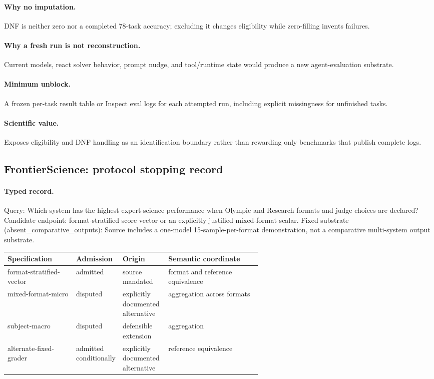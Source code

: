 \paragraph{Why no imputation.} DNF is neither zero nor a completed 78-task accuracy; excluding it changes eligibility while zero-filling invents failures.

\paragraph{Why a fresh run is not reconstruction.} Current models, react solver behavior, prompt nudge, and tool/runtime state would produce a new agent-evaluation substrate.

\paragraph{Minimum unblock.} A frozen per-task result table or Inspect eval logs for each attempted run, including explicit missingness for unfinished tasks.

\paragraph{Scientific value.} Exposes eligibility and DNF handling as an identification boundary rather than rewarding only benchmarks that publish complete logs.

\subsection{FrontierScience: protocol stopping record}\label{app:r8-frontierscience}

\paragraph{Typed record.} Query: Which system has the highest expert-science performance when Olympic and Research formats and judge choices are declared? Candidate endpoint: format-stratified score vector or an explicitly justified mixed-format scalar. Fixed substrate (absent\_comparative\_outputs): Source includes a one-model 15-sample-per-format demonstration, not a comparative multi-system output substrate.

\begingroup
\scriptsize
\begin{tabularx}{\linewidth}{@{}p{0.27\linewidth}p{0.14\linewidth}p{0.18\linewidth}X@{}}
\toprule
Specification & Admission & Origin & Semantic coordinate \\
\midrule
format-stratified-vector & admitted & source mandated & format and reference equivalence \\
mixed-format-micro & disputed & explicitly documented alternative & aggregation across formats \\
subject-macro & disputed & defensible extension & aggregation \\
alternate-fixed-grader & admitted conditionally & explicitly documented alternative & reference equivalence \\
\bottomrule
\end{tabularx}
\endgroup

